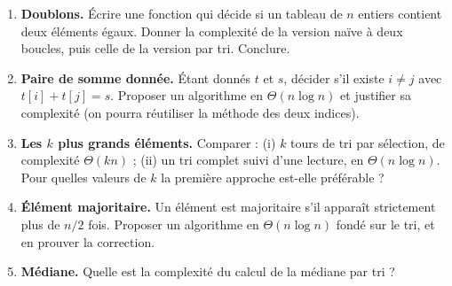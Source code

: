 \documentclass[11pt,a4paper]{article}
\begin{document}
\begin{enumerate}[label=\arabic*.,leftmargin=*]
  \item \textbf{Doublons.} Écrire une fonction qui décide si un tableau de $n$ entiers
        contient deux éléments égaux. Donner la complexité de la version naïve à deux
        boucles, puis celle de la version par tri. Conclure.
  \item \textbf{Paire de somme donnée.} Étant donnés $t$ et $s$, décider s'il existe
        $i\ne j$ avec $t[i]+t[j]=s$. Proposer un algorithme en $\Theta(n\log n)$ et
        justifier sa complexité (on pourra réutiliser la méthode des deux indices).
  \item \textbf{Les $k$ plus grands éléments.} Comparer :
        (i) $k$ tours de tri par sélection, de complexité $\Theta(kn)$ ;
        (ii) un tri complet suivi d'une lecture, en $\Theta(n\log n)$.
        Pour quelles valeurs de $k$ la première approche est-elle préférable ?
  \item \textbf{Élément majoritaire.} Un élément est majoritaire s'il apparaît
        strictement plus de $n/2$ fois. Proposer un algorithme en $\Theta(n\log n)$
        fondé sur le tri, et en prouver la correction.
  \item \textbf{Médiane.} Quelle est la complexité du calcul de la médiane par tri ?
\end{enumerate}
\end{document}

